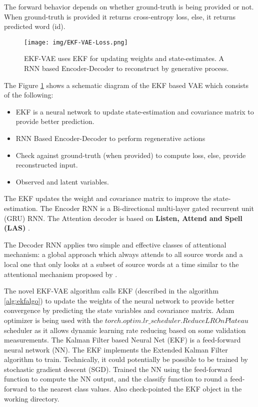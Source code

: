 \documentclass{article}
\begin{document}
The forward behavior depends on whether ground-truth is being provided or not. When ground-truth is provided it returns cross-entropy loss, else, it returns predicted word (id).

\begin{figure}[H]
  \centering
  \texttt{[image: img/EKF-VAE-Loss.png]}
  \caption{EKF-VAE uses EKF for updating weights and state-estimates. A RNN based Encoder-Decoder to reconstruct by generative process.}
  \label{fig:fig3}
\end{figure}

The Figure \ref{fig:fig3} shows a schematic diagram of the EKF based VAE which consists of the following:
\begin{itemize}
    \item EKF is a neural network to update state-estimation and covariance matrix to provide better prediction.
    \item RNN Based Encoder-Decoder to perform regenerative actions
    \item Check against ground-truth (when provided) to compute loss, else, provide reconstructed input.
    \item Observed and latent variables.
\end{itemize}
The EKF updates the weight and covariance matrix to improve the state-estimation. The Encoder RNN is a Bi-directional multi-layer gated recurrent unit (GRU) RNN. The Attention decoder is based on \textbf{Listen, Attend and Spell (LAS)} \cite{chan2015listen}. 

The Decoder RNN applies two simple and effective classes of attentional mechanism: a global approach which always attends to all source words and a local one that only looks at a subset of source words at a time similar to the attentional mechanism proposed by \cite{luong2015effective}. 

The novel EKF-VAE algorithm calls EKF (described in the algorithm \ref{alg:ekfalgo}) to update the weights of the neural network to provide better convergence by predicting the state variables and covariance matrix. Adam optimizer is being used with the $torch.optim.lr\_scheduler.ReduceLROnPlateau$ scheduler as it allows dynamic learning rate reducing based on some validation measurements. The Kalman Filter based Neural Net (EKF) is a feed-forward neural network (NN). The EKF implements the Extended Kalman Filter algorithm to train. Technically, it could potentially be possible to be trained by stochastic gradient descent (SGD). Trained the NN using the feed-forward function to compute the NN output, and the classify function to round a feed-forward to the nearest class values. Also check-pointed the EKF object in the working directory.
\end{document}
